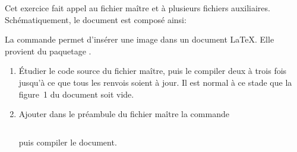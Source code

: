 \begin{exercice}[nosol]
  \label{ex:include}
  Cet exercice fait appel au fichier maître
   et à plusieurs fichiers auxiliaires.
  Schématiquement, le document est composé ainsi:

  \medskip
  \begin{minipage}{\linewidth}
  \end{minipage}
  \medskip

  La commande  permet d'insérer une image dans
  un document {\LaTeX}. Elle provient du paquetage .

  \begin{enumerate}
  \item Étudier le code source du fichier maître, puis le compiler
    deux à trois fois jusqu'à ce que tous les renvois soient à jour.
    Il est normal à ce stade que la figure~1 du document soit vide.
  \item Ajouter dans le préambule du fichier maître la commande
\begin{lstlisting}

\end{lstlisting}
    puis compiler le document.


\end{enumerate}
\end{exercice}

